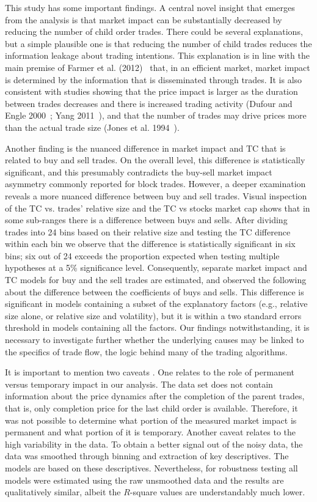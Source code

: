 This study has some important findings. A central novel insight that emerges from the analysis is that market impact can be substantially decreased by reducing the number of child order trades. There could be several explanations, but a simple plausible one is that reducing the number of child trades reduces the information leakage about trading intentions. This explanation is in line with the main premise of Farmer et al. (2012)~\cite{farmer2012} that, in an efficient market, market impact is determined by the information that is disseminated through trades. It is also consistent with studies showing that the price impact is larger as the duration between trades decreases and there is increased trading activity (Dufour and Engle 2000~\cite{dufour}; Yang 2011~\cite{yang2011}), and that the number of trades may drive prices more than the actual trade size (Jones et al. 1994~\cite{jones1994}).


Another finding is the nuanced difference in market impact and TC that is related to buy and sell trades. On the overall level, this difference is statistically significant, and this presumably contradicts the buy-sell market impact asymmetry commonly reported for block trades. However, a deeper examination reveals a more nuanced difference between buy and sell trades. Visual inspection of the TC vs. trades' relative size and the TC vs stocks market cap shows that in some sub-ranges there is a difference between buys and sells. After dividing trades into 24 bins based on their relative size and testing the TC difference within each bin we observe that the difference is statistically significant in six bins; six out of 24 exceeds the proportion expected when testing multiple hypotheses at a 5\% significance level. Consequently, separate market impact and TC models for buy and the sell trades are estimated, and observed the following about the difference between the coefficients of buys and sells. This difference is significant in models containing a subset of the explanatory factors (e.g., relative size alone, or relative size and volatility), but it is within a two standard errors threshold in models containing all the factors. Our findings notwithstanding, it is necessary to investigate further whether the underlying causes may be linked to the specifics of trade flow, the logic behind many of the trading algorithms.


It is important to mention two caveats . One relates to the role of permanent versus temporary impact in our analysis. The data set does not contain information about the price dynamics after the completion of the parent trades, that is, only completion price for the last child order is available. Therefore, it was not possible to determine what portion of the measured market impact is permanent and what portion of it is temporary. Another caveat relates to the high variability in the data. To obtain a better signal out of the noisy data, the data was smoothed through binning and extraction of key descriptives. The models are based on these descriptives. Nevertheless, for robustness testing all models were estimated using the raw unsmoothed data and the results are qualitatively similar, albeit the $R$-square values are understandably much lower. \\


